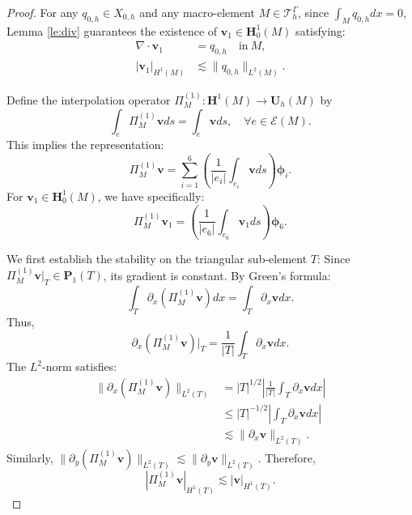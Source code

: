 \documentclass[10pt,a4paper]{amsart}
\begin{document}
\begin{proof}
	For any $q_{0,h} \in X_{0,h}$ and any macro-element $M \in \mathcal{T}_h^{\Gamma}$, since $\int_M q_{0,h}  dx = 0$, Lemma \ref{le:div} guarantees the existence of $\boldsymbol{v}_1 \in \bm{H}^1_0(M)$ satisfying:
	\begin{align*}
		\nabla \cdot \boldsymbol{v}_1 &= q_{0,h}\quad \text{in} ~M, \\
		|\boldsymbol{v}_1|_{H^1(M)} &\lesssim \|q_{0,h}\|_{L^2(M)}.
	\end{align*}
	
	Define the interpolation operator $\Pi^{(1)}_M: \bm{H}^1(M) \rightarrow \bm{U}_{h}(M)$ by
	\begin{equation}\label{eq:pi_m^1}
		\int_e \Pi^{(1)}_M \boldsymbol{v}  ds = \int_e \boldsymbol{v}  ds, \quad \forall e \in \mathcal{E}(M).
	\end{equation}
	This implies the representation:
	\[
	\Pi^{(1)}_M \boldsymbol{v} = \sum_{i=1}^{6} \left( \frac{1}{|e_i|} \int_{e_i} \boldsymbol{v}  ds \right) \boldsymbol{\phi}_i.
	\]
	For $\boldsymbol{v}_1 \in \bm{H}^1_0(M)$, we have specifically:
	\[
	\Pi^{(1)}_M \boldsymbol{v}_1 = \left( \frac{1}{|e_6|} \int_{e_6} \boldsymbol{v}_1  ds \right) \boldsymbol{\phi}_6.
	\]
	
	We first establish the stability on the triangular sub-element $T$:
	Since $\Pi^{(1)}_M \boldsymbol{v}|_T \in \bm{P}_1(T)$, its gradient is constant. By Green's formula:
	\[
	\int_T \partial_x (\Pi^{(1)}_M \boldsymbol{v})  dx = \int_T \partial_x \boldsymbol{v}  dx.
	\]
	Thus,
	\[
	\partial_x (\Pi^{(1)}_M \boldsymbol{v})|_T = \frac{1}{|T|} \int_T \partial_x \boldsymbol{v}  dx.
	\]
	The $L^2$-norm satisfies:
	\begin{align*}
		\|\partial_x (\Pi^{(1)}_M \boldsymbol{v})\|_{L^2(T)} 
		&= |T|^{1/2} \left| \frac{1}{|T|} \int_T \partial_x \boldsymbol{v}  dx \right| \\
		&\leq |T|^{-1/2} \left| \int_T \partial_x \boldsymbol{v}  dx \right| \\
		&\lesssim \|\partial_x \boldsymbol{v}\|_{L^2(T)}.
	\end{align*}
	Similarly, $\|\partial_y (\Pi^{(1)}_M \boldsymbol{v})\|_{L^2(T)} \lesssim \|\partial_y \boldsymbol{v}\|_{L^2(T)}$. Therefore,
	\begin{equation}\label{eq:pi_m^1err}
		|\Pi^{(1)}_M \boldsymbol{v}|_{H^1(T)} \lesssim |\boldsymbol{v}|_{H^1(T)}.
	\end{equation}
	

\end{proof}
\end{document}
